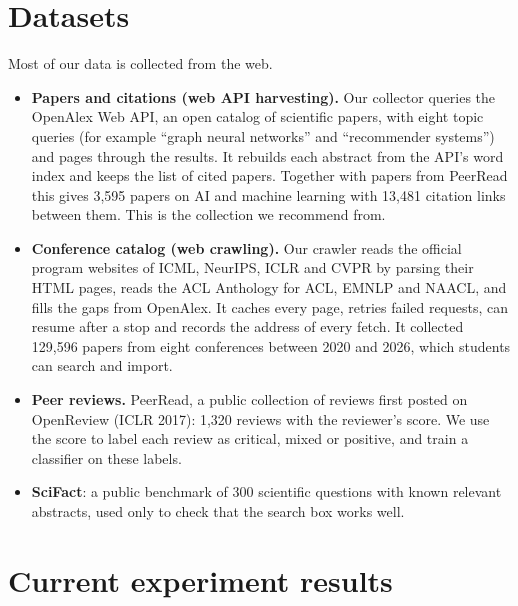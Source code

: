 \documentclass[11pt,a4paper]{article}
\begin{document}
\section{Datasets}\label{sec:data}
Most of our data is collected from the web.
\begin{itemize}
\item \textbf{Papers and citations (web API harvesting).} Our collector queries the OpenAlex Web API, an open catalog of scientific papers, with eight topic queries (for example ``graph neural networks'' and ``recommender systems'') and pages through the results. It rebuilds each abstract from the API's word index and keeps the list of cited papers. Together with papers from PeerRead this gives 3,595 papers on AI and machine learning with 13,481 citation links between them. This is the collection we recommend from.
\item \textbf{Conference catalog (web crawling).} Our crawler reads the official program websites of ICML, NeurIPS, ICLR and CVPR by parsing their HTML pages, reads the ACL Anthology for ACL, EMNLP and NAACL, and fills the gaps from OpenAlex. It caches every page, retries failed requests, can resume after a stop and records the address of every fetch. It collected 129,596 papers from eight conferences between 2020 and 2026, which students can search and import.
\item \textbf{Peer reviews.} PeerRead, a public collection of reviews first posted on OpenReview (ICLR 2017): 1,320 reviews with the reviewer's score. We use the score to label each review as critical, mixed or positive, and train a classifier on these labels.
\item \textbf{SciFact}: a public benchmark of 300 scientific questions with known relevant abstracts, used only to check that the search box works well.
\end{itemize}

\section{Current experiment results}
\end{document}
